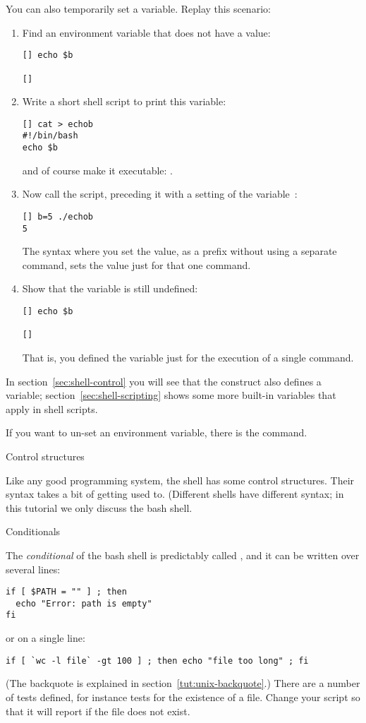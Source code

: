 You can also temporarily set a variable. Replay this scenario:
\begin{enumerate}
\item Find an environment variable that does not have a value:
\begin{lstlisting}
[] echo $b

[]
\end{lstlisting}
\item Write a short shell script to print this variable:
\begin{lstlisting}
[] cat > echob
#!/bin/bash
echo $b
\end{lstlisting}
and of course make it executable: .
\item Now call the script, preceding it with a setting of the variable~:
\begin{lstlisting}
[] b=5 ./echob
5
\end{lstlisting}
The syntax where you set the value, as a prefix without using a separate
command, sets the value just for that one command.
\item Show that the variable is still undefined:
\begin{lstlisting}
[] echo $b

[]
\end{lstlisting}
That is, you defined the variable just for the execution of a single command.
\end{enumerate}

In  section~\ref{sec:shell-control} you will see that the  construct
also defines a variable; section~\ref{sec:shell-scripting}
shows some more built-in variables that apply in shell scripts.

If you want to un-set an environment variable,
there is the  command.


 {Control structures}
\label{sec:shell-control}

Like any good programming system, the shell has some control
structures. Their syntax takes a bit of getting used to. (Different
shells have different syntax; in this tutorial we only discuss the
bash shell.

 {Conditionals}

The \emph{conditional} of the bash shell is predictably called
, and it can be written over several
lines:
\begin{lstlisting}
if [ $PATH = "" ] ; then
  echo "Error: path is empty"
fi
\end{lstlisting}
or on a single line:
\begin{lstlisting}
if [ `wc -l file` -gt 100 ] ; then echo "file too long" ; fi
\end{lstlisting}
(The backquote is explained in section~\ref{tut:unix-backquote}.)
There are a number of tests defined, for instance 
tests for the existence of a file. Change your script so that it will
report  if the file does not exist.

